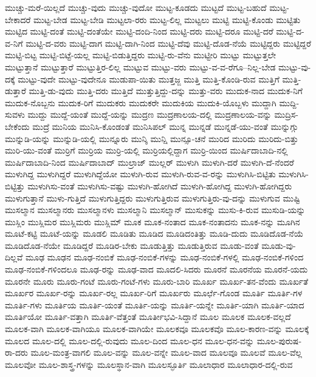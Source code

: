 {ಮುಚ್ಚು-ಮರೆ-ಯಿಲ್ಲದೆ
ಮುಚ್ಚು-ವುದು
ಮುಚ್ಚು-ವುದೋ
ಮುಟ್ಟ-ಕೂಡದು
ಮುಟ್ಟದೆ
ಮುಟ್ಟ-ಬಹುದೆ
ಮುಟ್ಟ-ಬೇಕಾದರೆ
ಮುಟ್ಟ-ಬೇಡ
ಮುಟ್ಟ-ಬೇಡಿ
ಮುಟ್ಟಲಾ-ರರು
ಮುಟ್ಟ-ಲಿಲ್ಲ
ಮುಟ್ಟಲು
ಮುಟ್ಟಿ
ಮುಟ್ಟಿ-ಕೊಂಡು
ಮುಟ್ಟಿತು
ಮುಟ್ಟಿದ
ಮುಟ್ಟಿ-ದಂತೆ
ಮುಟ್ಟಿ-ದಂತೆಯೇ
ಮುಟ್ಟಿ-ದಂದಿ-ನಿಂದ
ಮುಟ್ಟಿ-ದರು
ಮುಟ್ಟಿ-ದರೂ
ಮುಟ್ಟಿ-ದರೆ
ಮುಟ್ಟಿ-ದ-ವ-ನಿಗೆ
ಮುಟ್ಟಿ-ದ-ವರು
ಮುಟ್ಟಿ-ದಾಗ
ಮುಟ್ಟಿ-ದಾಗಿ-ನಿಂದ
ಮುಟ್ಟಿ-ದೆವು
ಮುಟ್ಟಿ-ದೊಡ-ನೆಯೆ
ಮುಟ್ಟಿದ್ದರು
ಮುಟ್ಟಿದ್ದರೆ
ಮುಟ್ಟಿ-ಬಿಟ್ಟ
ಮುಟ್ಟಿ-ಬಿಟ್ಟೆ-ಯಲ್ಲ
ಮುಟ್ಟಿ-ಬಿಡುತ್ತಿದ್ದರು
ಮುಟ್ಟಿ-ರು-ವೆನು
ಮುಟ್ಟೀರಿ
ಮುಟ್ಟು
ಮುಟ್ಟುತ್ತಲೇ
ಮುಟ್ಟುತ್ತಾನೆ
ಮುಟ್ಟುತ್ತಾರೆ
ಮುಟ್ಟುತ್ತಿರ-ಲಿಲ್ಲ
ಮುಟ್ಟುವ
ಮುಟ್ಟು-ವರು
ಮುಟ್ಟು-ವ-ವ-ರೆಗೂ--ನಿಲ್ಲ-ಬೇಡ
ಮುಟ್ಟು-ವು-ದಕ್ಕೆ
ಮುಟ್ಟು-ವುದೇ
ಮುಟ್ಟು-ವುದೇನೂ
ಮುಡುಪಾ-ಯಿತು
ಮುತ್ತಜ್ಜ
ಮುತ್ತಿ
ಮುತ್ತಿ-ಕೊಂಡಿ-ರುವ
ಮುತ್ತಿಗೆ
ಮುತ್ತಿ-ಡುತ್ತಾರೆ
ಮುತ್ತಿ-ಡು-ವುದು
ಮುತ್ತಿ-ದರು
ಮುತ್ತಿದೆ
ಮುತ್ತುತ್ತಿದ್ದು-ದನ್ನು
ಮುತ್ತು-ವರು
ಮುದುಕ-ನಾದ
ಮುದುಕ-ನಿಗೆ
ಮುದುಕ-ನೊಬ್ಬನು
ಮುದುಕ-ರಿಗೆ
ಮುದುಕರು
ಮುದುಕರೇ
ಮುದುಕಿಯ
ಮುದುಕಿ-ಯೊಬ್ಬಳು
ಮುದ್ದಾಗಿ
ಮುದ್ದಿ-ಸುವಳು
ಮುದ್ದು
ಮುದ್ದೆ-ಯಂತೆ
ಮುದ್ದೆ-ಯನ್ನು
ಮುದ್ರಣ
ಮುದ್ರಣಾಲಯ-ದಲ್ಲಿ
ಮುದ್ರಣಾಲಯ-ವನ್ನು
ಮುದ್ರಿಸ-ಬೇಕೆಂದು
ಮುದ್ರೆ
ಮುನಿಯ
ಮುನಿಸಿ-ಕೊಂಡಂತೆ
ಮುನಿಸಿಪಲ್
ಮುನ್ನ
ಮುನ್ನಡೆ
ಮುನ್ನಡೆ-ಯು-ವಂತೆ
ಮುನ್ನುಗ್ಗು
ಮುನ್ನುಡಿ-ಯನ್ನು
ಮುನ್ನುಡಿ-ಯಲ್ಲಿ
ಮುನ್ನೂರು
ಮುನ್ಶಿ
ಮುನ್ಷಿ
ಮುನ್ಸೂ-ಚನೆ
ಮುರಿದ
ಮುರಿದು
ಮುರಿದು-ಬಿತ್ತು
ಮುರಿ-ಯು-ವಂತೆ
ಮುರ್ರಿಗೆ
ಮುರ್ರಿಯ
ಮುರ್ರಿ-ಯಲ್ಲಿ
ಮುರ್ರಿಯಲ್ಲಿದ್ದಾಗ
ಮುರ್ರಿ-ಯಿಂದ
ಮುರ್ಷಿದಾಬಾದಿ-ನಲ್ಲಿ
ಮುರ್ಷಿದಾಬಾದಿ-ನಿಂದ
ಮುರ್ಷಿದಾಬಾದ್
ಮುಲ್ರಾಜ್
ಮುಲ್ಲರ್
ಮುಳುಗಿ
ಮುಳುಗಿ-ದರೆ
ಮುಳುಗಿ-ದೆ-ನೆಂದರೆ
ಮುಳುಗಿದ್ದ
ಮುಳುಗಿದ್ದರೆ
ಮುಳುಗಿದ್ದೆಯೋ
ಮುಳುಗಿ-ರುವ
ಮುಳುಗಿ-ರುವ-ವ-ರನ್ನು
ಮುಳುಗಿಸಿ-ಬಿಟ್ಟಿತು
ಮುಳುಗಿಸಿ-ಬಿಟ್ಟಿತ್ತು
ಮುಳುಗಿಸು-ವಂತೆ
ಮುಳುಗಿಸು-ವಷ್ಟು
ಮುಳುಗಿ-ಹೋಗಿದೆ
ಮುಳುಗಿ-ಹೋಗಿದ್ದ
ಮುಳುಗಿ-ಹೋಗಿದ್ದರು
ಮುಳುಗುತ್ತಾನೆ
ಮುಳು-ಗುತ್ತಿದೆ
ಮುಳುಗುತ್ತಿದ್ದರು
ಮುಳುಗುತ್ತಿರುವ
ಮುಳುಗುತ್ತಿರು-ವು-ದನ್ನು
ಮುಳುಗುವ
ಮುಷ್ಟಿ
ಮುಸಲ್ಮಾನ
ಮುಸಲ್ಮಾನರು
ಮುಸಲ್ಮಾನಳು
ಮುಸಲ್ಮಾನಿ
ಮುಸಲ್ಮಾನ್
ಮುಸುಕನ್ನು
ಮುಸು-ಕಿ-ರುವ
ಮುಸುಡಿ-ಯನ್ನು
ಮುಸ್ಲಿಂ
ಮುಸ್ಲಿಮರ
ಮುಸ್ಲಿಮರು
ಮುಸ್ಲಿಮ್
ಮೂಕ
ಮೂಕ-ನಂತಾದ
ಮೂಕ-ನಂತಾದನು
ಮೂಕ-ನನ್ನು
ಮೂಗಿನ
ಮೂಟೆ-ಕಟ್ಟಿ
ಮೂಟೆ-ಯನ್ನು
ಮೂಡಲಿ
ಮೂಡಿತು
ಮೂಡಿದ
ಮೂಡಿದಂತಿತ್ತು
ಮೂಡಿ-ದುದು
ಮೂಡಿದೊಡ-ನೆಯೆ
ಮೂಡಿದೊಡ-ನೆಯೇ
ಮೂಡಿದ್ದರೆ
ಮೂಡಿರ-ಬೇಕು
ಮೂಡುತ್ತಿತ್ತು
ಮೂಡುತ್ತಿರುವ
ಮೂಡು-ವಂತೆ
ಮೂಡು-ವು-ದಿಲ್ಲವೆ
ಮೂಢ
ಮೂಢನ
ಮೂಢ-ನಂಬಿಕೆ
ಮೂಢ-ನಂಬಿಕೆ-ಗಳನ್ನು
ಮೂಢ-ನಂಬಿಕೆ-ಗಳಲ್ಲಿ
ಮೂಢ-ನಂಬಿಕೆ-ಗಳಿಂದ
ಮೂಢ-ನಂಬಿಕೆ-ಗಳಿಂದಲೂ
ಮೂಢ-ರನ್ನು
ಮೂಢ-ವಾದ
ಮೂದಲಿ-ಸಿದರು
ಮೂರನೆ
ಮೂರನೆಯ
ಮೂರನೆ-ಯದು
ಮೂರನೇ
ಮೂರು
ಮೂರು-ಗಂಟೆ
ಮೂರು-ಗಂಟೆ-ಗಳು
ಮೂರು-ಬಾರಿ
ಮೂರ್ಖ
ಮೂರ್ಖ-ತನ-ವೆಂದು
ಮೂರ್ಖತೆ
ಮೂರ್ಖರ
ಮೂರ್ಖ-ರನ್ನು
ಮೂರ್ಖ-ರಲ್ಲ
ಮೂರ್ಖ-ರಿಗೆ
ಮೂರ್ಖರು
ಮೂರ್ಛೆ-ಗೊಂಡ
ಮೂರ್ತಿ
ಮೂರ್ತಿ-ಗಳ
ಮೂರ್ತಿ-ಗಳು
ಮೂರ್ತಿಯ
ಮೂರ್ತಿ-ಯಂತೆ
ಮೂರ್ತಿ-ಯನ್ನು
ಮೂರ್ತಿ-ಯನ್ನೇ
ಮೂರ್ತಿ-ಯಾಗಿ
ಮೂರ್ತಿ-ಯಾದ
ಮೂರ್ತಿಯೋ
ಮೂರ್ತಿ-ವತ್ತಾಗಿ
ಮೂರ್ತಿ-ವೆತ್ತಂತೆ
ಮೂರ್ತೀಭವಿ-ಸಿದ್ದಾನೆ
ಮೂಲ
ಮೂಲಕ
ಮೂಲಕ-ವಲ್ಲದೆ
ಮೂಲಕ-ವಾಗಿ
ಮೂಲಕ-ವಾಗಿಯೂ
ಮೂಲಕ-ವಾಗಿಯೇ
ಮೂಲಕವೂ
ಮೂಲಕವೊ
ಮೂಲ-ಕಾರಣ-ವನ್ನು
ಮೂಲಕ್ಕೆ
ಮೂಲದ
ಮೂಲ-ದಲ್ಲಿ
ಮೂಲ-ದಲ್ಲಿ-ರುವುದು
ಮೂಲ-ದಿಂದ
ಮೂಲ-ಧನ
ಮೂಲ-ಧನ-ವನ್ನು
ಮೂಲ-ಪುರುಷ-ರಾ-ದರು
ಮೂಲ-ಮಂತ್ರ-ವಾಗಲಿ
ಮೂಲ-ವನ್ನು
ಮೂಲ-ವನ್ನೇ
ಮೂಲ-ವಾದ
ಮೂಲವೂ
ಮೂಲವೆ
ಮೂಲ-ವೆಲ್ಲ
ಮೂಲವೋ
ಮೂಲ-ಶಾಸ್ತ್ರ-ಗಳನ್ನು
ಮೂಲಸ್ಥಾನ-ವಾಗಿ
ಮೂಲಸ್ಫೂರ್ತಿ
ಮೂಲಾಧಾರ
ಮೂಲಾಧಾರ-ದಲ್ಲಿ-ರುವ
}
